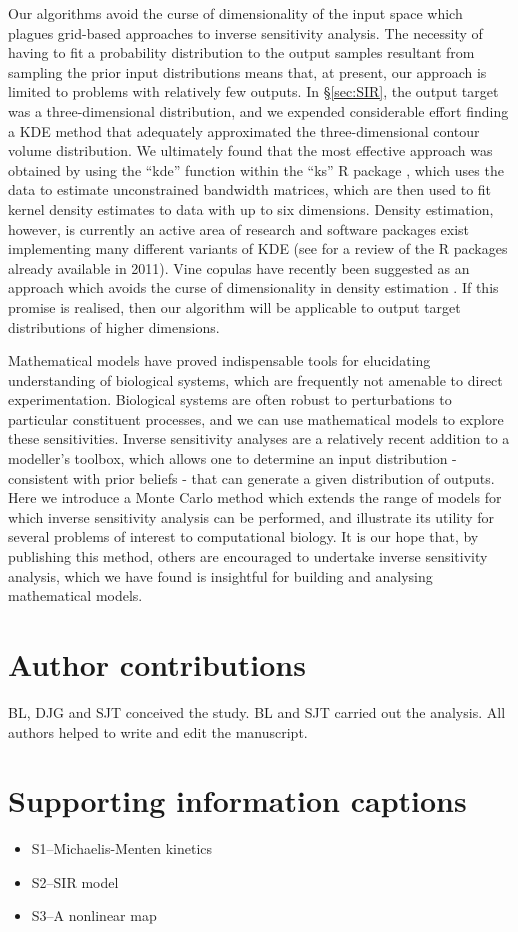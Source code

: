 \documentclass[10pt,letterpaper]{article}
\begin{document}
Our algorithms avoid the curse of dimensionality of the input space which plagues grid-based approaches to inverse sensitivity analysis. The necessity of having to fit a probability distribution to the output samples resultant from sampling the prior input distributions means that, at present, our approach is limited to problems with relatively few outputs. In \S \ref{sec:SIR}, the output target was a three-dimensional distribution, and we expended considerable effort finding a KDE method that adequately approximated the three-dimensional contour volume distribution. We ultimately found that the most effective approach was obtained by using the ``kde'' function within the ``ks'' R package \cite{duong2018package,RLanguage}, which uses the data to estimate unconstrained bandwidth matrices, which are then used to fit kernel density estimates to data with up to six dimensions. Density estimation, however, is currently an active area of research and software packages exist implementing many different variants of KDE (see \cite{deng2011density} for a review of the R packages already available in 2011). Vine copulas have recently been suggested as an approach which avoids the curse of dimensionality in density estimation \cite{nagler2016evading}. If this promise is realised, then our algorithm will be applicable to output target distributions of higher dimensions.

Mathematical models have proved indispensable tools for elucidating understanding of biological systems, which are frequently not amenable to direct experimentation. Biological systems are often robust to perturbations to particular constituent processes, and we can use mathematical models to explore these sensitivities. Inverse sensitivity analyses are a relatively recent addition to a modeller's toolbox, which allows one to determine an input distribution - consistent with prior beliefs - that can generate a given distribution of outputs. Here we introduce a Monte Carlo method which extends the range of models for which inverse sensitivity analysis can be performed, and illustrate its utility for several problems of interest to computational biology. It is our hope that, by publishing this method, others are encouraged to undertake inverse sensitivity analysis, which we have found is insightful for building and analysing mathematical models.

\section{Author contributions}
BL, DJG and SJT conceived the study. BL and SJT carried out the analysis. All authors helped to write and edit the manuscript.


\nolinenumbers




\section*{Supporting information captions}
\begin{itemize}
  \item S1--Michaelis-Menten kinetics
  \item S2--SIR model
  \item S3--A nonlinear map
\end{itemize}
\end{document}
